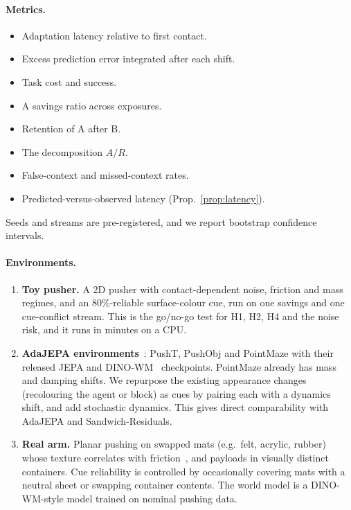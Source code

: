 \documentclass[10pt]{article}
\begin{document}
\paragraph{Metrics.}
\begin{itemize}
  \item Adaptation latency relative to first contact.
  \item Excess prediction error integrated after each shift.
  \item Task cost and success.
  \item A savings ratio across exposures.
  \item Retention of A after B.
  \item The decomposition $A/R$.
  \item False-context and missed-context rates.
  \item Predicted-versus-observed latency (Prop.~\ref{prop:latency}).
\end{itemize}
Seeds and streams are pre-registered, and we report bootstrap confidence intervals.

\paragraph{Environments.}
\begin{enumerate}[label=(\roman*)]
  \item \textbf{Toy pusher.} A 2D pusher with contact-dependent noise, friction and mass regimes, and an
  80\%-reliable surface-colour cue, run on one savings and one cue-conflict stream. This is the go/no-go
  test for H1, H2, H4 and the noise risk, and it runs in minutes on a CPU.
  \item \textbf{AdaJEPA environments}~\cite{wang2026adajepa}: PushT, PushObj and PointMaze with their
  released JEPA and DINO-WM~\cite{zhou2025dinowm} checkpoints. PointMaze already has mass and damping
  shifts. We repurpose the existing appearance changes (recolouring the agent or block) as cues by
  pairing each with a dynamics shift, and add stochastic dynamics. This gives direct comparability with
  AdaJEPA and Sandwich-Residuals.
  \item \textbf{Real arm.} Planar pushing on swapped mats (e.g.\ felt, acrylic, rubber) whose texture
  correlates with friction~\cite{yu2016million}, and payloads in visually distinct containers. Cue
  reliability is controlled by occasionally covering mats with a neutral sheet or swapping container
  contents. The world model is a DINO-WM-style model trained on nominal pushing data.
\end{enumerate}
\end{document}
